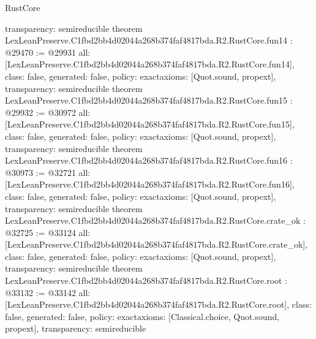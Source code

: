 \begin{lexlean}{RustCore}
\begin{coremodule}
{  transparency: semireducible
}
theorem LexLeanPreserve.C1fbd2bb4d02044a268b374faf4817bda.R2.RustCore.fun14 : @29470 := @29931 {
  all: [LexLeanPreserve.C1fbd2bb4d02044a268b374faf4817bda.R2.RustCore.fun14],
  class: false,
  generated: false,
  policy: exact{axioms: [Quot.sound, propext]},
  transparency: semireducible
}
theorem LexLeanPreserve.C1fbd2bb4d02044a268b374faf4817bda.R2.RustCore.fun15 : @29932 := @30972 {
  all: [LexLeanPreserve.C1fbd2bb4d02044a268b374faf4817bda.R2.RustCore.fun15],
  class: false,
  generated: false,
  policy: exact{axioms: [Quot.sound, propext]},
  transparency: semireducible
}
theorem LexLeanPreserve.C1fbd2bb4d02044a268b374faf4817bda.R2.RustCore.fun16 : @30973 := @32721 {
  all: [LexLeanPreserve.C1fbd2bb4d02044a268b374faf4817bda.R2.RustCore.fun16],
  class: false,
  generated: false,
  policy: exact{axioms: [Quot.sound, propext]},
  transparency: semireducible
}
theorem LexLeanPreserve.C1fbd2bb4d02044a268b374faf4817bda.R2.RustCore.crate_ok : @32725 := @33124 {
  all: [LexLeanPreserve.C1fbd2bb4d02044a268b374faf4817bda.R2.RustCore.crate_ok],
  class: false,
  generated: false,
  policy: exact{axioms: [Quot.sound, propext]},
  transparency: semireducible
}
theorem LexLeanPreserve.C1fbd2bb4d02044a268b374faf4817bda.R2.RustCore.root : @33132 := @33142 {
  all: [LexLeanPreserve.C1fbd2bb4d02044a268b374faf4817bda.R2.RustCore.root],
  class: false,
  generated: false,
  policy: exact{axioms: [Classical.choice, Quot.sound, propext]},
  transparency: semireducible
}


\end{coremodule}
\end{lexlean}
